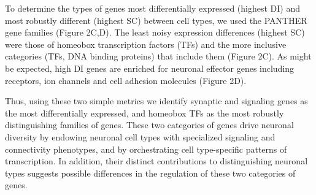 To determine the types of genes most differentially expressed (highest DI) and most robustly different (highest SC) between cell types, we used the PANTHER gene families \citep{Mi_2016} (Figure 2C,D). The least noisy expression differences (highest SC) were those of homeobox transcription factors (TFs) and the more inclusive categories (TFs, DNA binding proteins) that include them (Figure 2C). As might be expected, high DI genes are enriched for neuronal effector genes including receptors, ion channels and cell adhesion molecules (Figure 2D). 

Thus, using these two simple metrics we identify synaptic and signaling genes as the most differentially expressed, and homeobox TFs as the most robustly distinguishing families of genes. These two categories of genes drive neuronal diversity by endowing neuronal cell types with specialized signaling and connectivity phenotypes, and by orchestrating cell type-specific patterns of transcription. In addition, their distinct contributions to distinguishing neuronal types suggests possible differences in the regulation of these two categories of genes. 


